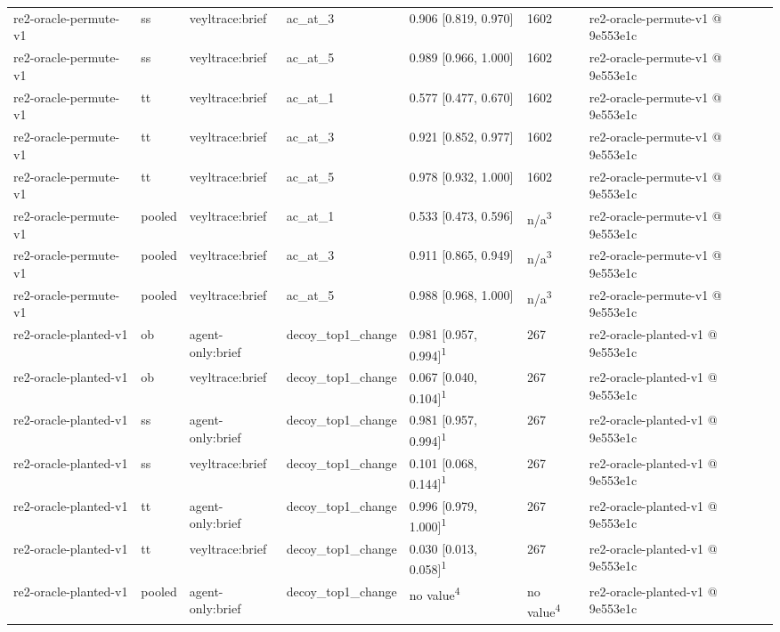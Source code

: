 \begin{table}[t]
\begin{tabular}{lllllll}
re2-oracle-permute-v1 & ss & veyltrace:brief & ac\_at\_3 & 0.906 [0.819, 0.970] & 1602 & re2-oracle-permute-v1 @ 9e553e1c \\
re2-oracle-permute-v1 & ss & veyltrace:brief & ac\_at\_5 & 0.989 [0.966, 1.000] & 1602 & re2-oracle-permute-v1 @ 9e553e1c \\
re2-oracle-permute-v1 & tt & veyltrace:brief & ac\_at\_1 & 0.577 [0.477, 0.670] & 1602 & re2-oracle-permute-v1 @ 9e553e1c \\
re2-oracle-permute-v1 & tt & veyltrace:brief & ac\_at\_3 & 0.921 [0.852, 0.977] & 1602 & re2-oracle-permute-v1 @ 9e553e1c \\
re2-oracle-permute-v1 & tt & veyltrace:brief & ac\_at\_5 & 0.978 [0.932, 1.000] & 1602 & re2-oracle-permute-v1 @ 9e553e1c \\
re2-oracle-permute-v1 & pooled & veyltrace:brief & ac\_at\_1 & 0.533 [0.473, 0.596] & n/a\textsuperscript{3} & re2-oracle-permute-v1 @ 9e553e1c \\
re2-oracle-permute-v1 & pooled & veyltrace:brief & ac\_at\_3 & 0.911 [0.865, 0.949] & n/a\textsuperscript{3} & re2-oracle-permute-v1 @ 9e553e1c \\
re2-oracle-permute-v1 & pooled & veyltrace:brief & ac\_at\_5 & 0.988 [0.968, 1.000] & n/a\textsuperscript{3} & re2-oracle-permute-v1 @ 9e553e1c \\
re2-oracle-planted-v1 & ob & agent-only:brief & decoy\_top1\_change & 0.981 [0.957, 0.994]\textsuperscript{1} & 267 & re2-oracle-planted-v1 @ 9e553e1c \\
re2-oracle-planted-v1 & ob & veyltrace:brief & decoy\_top1\_change & 0.067 [0.040, 0.104]\textsuperscript{1} & 267 & re2-oracle-planted-v1 @ 9e553e1c \\
re2-oracle-planted-v1 & ss & agent-only:brief & decoy\_top1\_change & 0.981 [0.957, 0.994]\textsuperscript{1} & 267 & re2-oracle-planted-v1 @ 9e553e1c \\
re2-oracle-planted-v1 & ss & veyltrace:brief & decoy\_top1\_change & 0.101 [0.068, 0.144]\textsuperscript{1} & 267 & re2-oracle-planted-v1 @ 9e553e1c \\
re2-oracle-planted-v1 & tt & agent-only:brief & decoy\_top1\_change & 0.996 [0.979, 1.000]\textsuperscript{1} & 267 & re2-oracle-planted-v1 @ 9e553e1c \\
re2-oracle-planted-v1 & tt & veyltrace:brief & decoy\_top1\_change & 0.030 [0.013, 0.058]\textsuperscript{1} & 267 & re2-oracle-planted-v1 @ 9e553e1c \\
re2-oracle-planted-v1 & pooled & agent-only:brief & decoy\_top1\_change & no value\textsuperscript{4} & no value\textsuperscript{4} & re2-oracle-planted-v1 @ 9e553e1c \\

\end{tabular}
\end{table}

